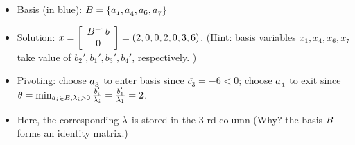 \documentclass[mathserif]{beamer}
\begin{document}
{\begin{scriptsize}
\begin{itemize}
 \item Basis (in blue):  \textcolor{blue}{$\mathnormal{B =\{a_1, a_4, a_6, a_7 \} }$}
 \item Solution: $\mathnormal{x=\left[\begin{array}{c}\mathnormal{B^{-1}b}\\{0}\end{array}\right]}= ( 2, 0, 0, 2, 0, 3, 6 )$. (Hint: basis variables $x_1,x_4,x_6,x_7$ take value of $b_2', b_1', b_3', b_4'$, respectively. )
 \item Pivoting: choose  \textcolor{green}{$\mathnormal{a_3}$} to enter basis since $\overline{c_3} = -6 < 0$; choose  \textcolor{red}{$\mathnormal{a_4}$} to exit since $\theta = \min_{\mathnormal{a}_i \in \mathnormal{B}, \lambda_{i}>0} \frac{b'_i}{\lambda_{i} } = \frac{b'_1}{\lambda_{1} }= 2$.
  \item Here, the corresponding $\mathnormal{\lambda}$ is stored in the $3$-rd column (Why? the basis $\mathnormal{B}$ forms an identity matrix.)
\end{itemize}

\end{scriptsize}
}
\end{document}
